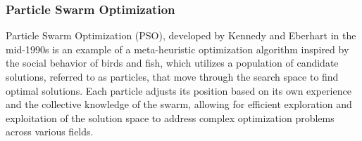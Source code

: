 \documentclass{article}[12pt]
\begin{document}


\subsubsection*{Particle Swarm Optimization}
Particle Swarm Optimization (PSO), developed by Kennedy and Eberhart in the mid-1990s \cite{PSO1995} is an example of a meta-heuristic optimization algorithm inspired by the social behavior of birds and fish, which utilizes a population of candidate solutions, referred to as particles, that move through the search space to find optimal solutions. 
Each particle adjusts its position based on its own experience and the collective knowledge of the swarm, allowing for efficient exploration and exploitation of the solution space to address complex optimization problems across various fields.
\end{document}
